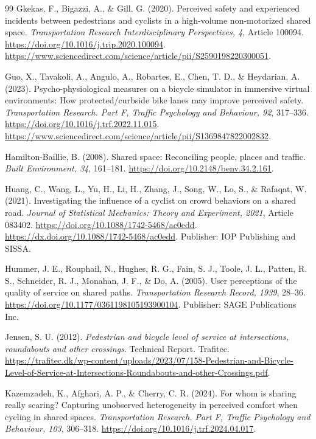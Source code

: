 \begin{thebibliography}{99}
Gkekas, F., Bigazzi, A., \& Gill, G. (2020). Perceived safety and experienced
incidents between pedestrians and cyclists in a high-volume non-motorized shared
space. \emph{Transportation Research Interdisciplinary Perspectives, 4}, Article
100094. \url{https://doi.org/10.1016/j.trip.2020.100094}.
\url{https://www.sciencedirect.com/science/article/pii/S2590198220300051}.

Guo, X., Tavakoli, A., Angulo, A., Robartes, E., Chen, T. D., \& Heydarian, A.
(2023). Psycho-physiological measures on a bicycle simulator in immersive
virtual environments: How protected/curbside bike lanes may improve perceived
safety. \emph{Transportation Research. Part F, Traffic Psychology and Behaviour,
92}, 317--336. \url{https://doi.org/10.1016/j.trf.2022.11.015}.
\url{https://www.sciencedirect.com/science/article/pii/S1369847822002832}.

Hamilton-Baillie, B. (2008). Shared space: Reconciling people, places and
traffic. \emph{Built Environment, 34}, 161--181.
\url{https://doi.org/10.2148/benv.34.2.161}.

Huang, C., Wang, L., Yu, H., Li, H., Zhang, J., Song, W., Lo, S., \& Rafaqat, W.
(2021). Investigating the influence of a cyclist on crowd behaviors on a shared
road. \emph{Journal of Statistical Mechanics: Theory and Experiment, 2021},
Article 083402. \url{https://doi.org/10.1088/1742-5468/ac0edd}.
\url{https://dx.doi.org/10.1088/1742-5468/ac0edd}. Publisher: IOP Publishing and
SISSA.

Hummer, J. E., Rouphail, N., Hughes, R. G., Fain, S. J., Toole, J. L., Patten,
R. S., Schneider, R. J., Monahan, J. F., \& Do, A. (2005). User perceptions of
the quality of service on shared paths. \emph{Transportation Research Record,
1939}, 28--36. \url{https://doi.org/10.1177/0361198105193900104}. Publisher:
SAGE Publications Inc.

Jensen, S. U. (2012). \emph{Pedestrian and bicycle level of service at
intersections, roundabouts and other crossings}. Technical Report. Trafitec.
\url{https://trafitec.dk/wp-content/uploads/2023/07/158-Pedestrian-and-Bicycle-Level-of-Service-at-Intersections-Roundabouts-and-other-Crossings.pdf}.

Kazemzadeh, K., Afghari, A. P., \& Cherry, C. R. (2024). For whom is sharing
really scaring? Capturing unobserved heterogeneity in perceived comfort when
cycling in shared spaces. \emph{Transportation Research. Part F, Traffic
Psychology and Behaviour, 103}, 306--318.
\url{https://doi.org/10.1016/j.trf.2024.04.017}.


\end{thebibliography}
